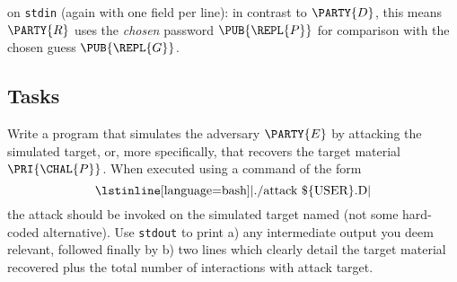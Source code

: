 \documentclass[crop={false},multi={true},tikz={true}]{standalone}
\begin{document}
\noindent
on \lstinline[language={bash}]{stdin} (again with one field per line):
in contrast to $\PARTY{D}$, this means $\PARTY{R}$ uses the
{\em chosen} password $\PUB{\REPL{P}}$
for comparison with the
     chosen  guess    $\PUB{\REPL{G}}$.

\subsection{Tasks}

      Write a program that simulates the adversary $\PARTY{E}$ by attacking
      the simulated target, or, more specifically, that recovers the target 
      material $\PRI{\CHAL{P}}$.  
      When executed using a command of the form
      \[
      \mbox{\lstinline[language={bash}]|./attack \$\{USER\}.D|}
      \]
      the attack should be invoked on the simulated target named (not some
      hard-coded alternative).  Use \lstinline[language={bash}]{stdout} to 
      print 
      a) any intermediate output you deem relevant, followed finally by 
      b) two lines which clearly detail the target material recovered plus
         the total number of interactions with attack target.


\ifstandalone
\printbibliography
\fi
\end{document}

